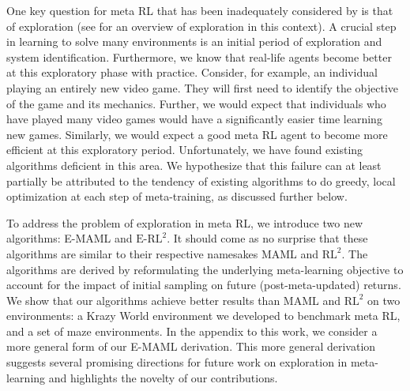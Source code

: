 \documentclass{article} %
\begin{document}
One key question for meta RL that has been inadequately considered by \cite{maml, rl2} is that of exploration (see \cite{schex2} for an overview of exploration in this context). A crucial step in learning to solve many environments is an initial period of exploration and system identification. Furthermore, we know that real-life agents become better at this exploratory phase with practice. Consider, for example, an individual playing an entirely new video game. They will first need to identify the objective of the game and its mechanics. Further, we would expect that individuals who have played many video games would have a significantly easier time learning new games. Similarly, we would expect a good meta RL agent to become more efficient at this exploratory period. Unfortunately, we have found existing algorithms deficient in this area. We hypothesize that this failure can at least partially be attributed to the tendency of existing algorithms to do greedy, local optimization at each step of meta-training, as discussed further below. 

To address the problem of exploration in meta RL, we introduce two new algorithms: E-MAML and $\text{E-RL}^2$. It should come as no surprise that these algorithms are similar to their respective namesakes MAML and $\text{RL}^2$. The algorithms are derived by reformulating the underlying meta-learning objective to account for the impact of initial sampling on future (post-meta-updated) returns. We show that our algorithms achieve better results than MAML and $\text{RL}^2$ on two environments: a Krazy World environment we developed to benchmark meta RL, and a set of maze environments. In the appendix to this work, we consider a more general form of our E-MAML derivation. This more general derivation suggests several promising directions for future work on exploration in meta-learning and highlights the novelty of our contributions. 


\end{document}
